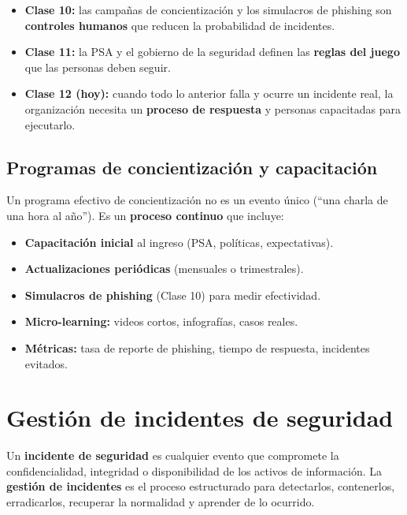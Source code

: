 \documentclass[12pt,a4paper]{article}
\begin{document}
\begin{cajaNota}[title={La conexión con lo anterior}]
\begin{itemize}[leftmargin=2em]
    \item \textbf{Clase 10:} las campañas de concientización y los simulacros de phishing son \textbf{controles humanos} que reducen la probabilidad de incidentes.
    \item \textbf{Clase 11:} la PSA y el gobierno de la seguridad definen las \textbf{reglas del juego} que las personas deben seguir.
    \item \textbf{Clase 12 (hoy):} cuando todo lo anterior falla y ocurre un incidente real, la organizaci\'on necesita un \textbf{proceso de respuesta} y personas capacitadas para ejecutarlo.
\end{itemize}
\end{cajaNota}

\subsection{Programas de concientizaci\'on y capacitaci\'on}

Un programa efectivo de concientizaci\'on no es un evento \'unico (``una charla de una hora al a\~no''). Es un \textbf{proceso continuo} que incluye:

\begin{itemize}[leftmargin=2em]
    \item \textbf{Capacitaci\'on inicial} al ingreso (PSA, pol\'iticas, expectativas).
    \item \textbf{Actualizaciones peri\'odicas} (mensuales o trimestrales).
    \item \textbf{Simulacros de phishing} (Clase 10) para medir efectividad.
    \item \textbf{Micro-learning:} videos cortos, infograf\'ias, casos reales.
    \item \textbf{M\'etricas:} tasa de reporte de phishing, tiempo de respuesta, incidentes evitados.
\end{itemize}

\newpage
\section{Gesti\'on de incidentes de seguridad}

\begin{cajaDefinicion}
Un \textbf{incidente de seguridad} es cualquier evento que compromete la confidencialidad, integridad o disponibilidad de los activos de informaci\'on. La \textbf{gesti\'on de incidentes} es el proceso estructurado para detectarlos, contenerlos, erradicarlos, recuperar la normalidad y aprender de lo ocurrido.
\end{cajaDefinicion}
\end{document}
